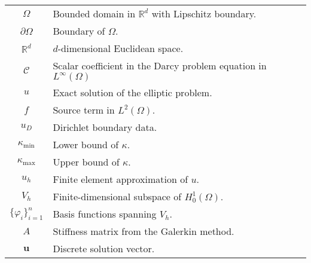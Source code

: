\begin{longtable}{c p{10cm}}
    $\Omega$                        & Bounded domain in $\mathbb{R}^d$ with Lipschitz boundary.                                                     \\
    $\partial\Omega$                & Boundary of $\Omega$.                                                                                         \\
    $\mathbb{R}^d$                  & $d$-dimensional Euclidean space.                                                                              \\
    $\mathcal{C}$                        & Scalar coefficient in the Darcy problem equation in $L^\infty(\Omega)$                                   \\
    $u$                             & Exact solution of the elliptic problem.                                                                       \\
    $f$                             & Source term in $L^2(\Omega)$.                                                                                 \\
    $u_D$                           & Dirichlet boundary data.                                                                                      \\
    $\kappa_{\min}$                 & Lower bound of $\kappa$.                                                                                      \\
    $\kappa_{\max}$                 & Upper bound of $\kappa$.                                                                                      \\
    $u_h$                           & Finite element approximation of $u$.                                                                          \\
    $V_h$                           & Finite-dimensional subspace of $H^1_0(\Omega)$.                                                               \\
    $\{\varphi_i\}_{i=1}^n$         & Basis functions spanning $V_h$.                                                                               \\
    $A$                             & Stiffness matrix from the Galerkin method.                                                                    \\
    $\mathbf{u}$                    & Discrete solution vector.                                                                                     \\

\end{longtable}
